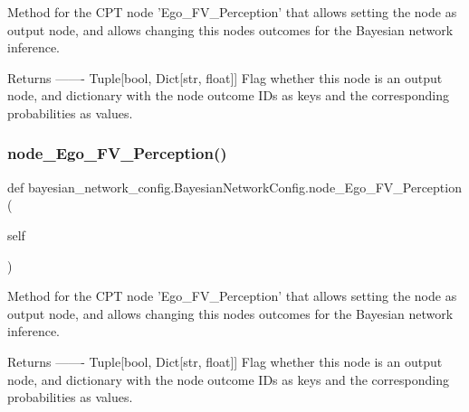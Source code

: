 \begin{DoxyVerb}Method for the CPT node 'Ego_FV_Perception' that allows setting the node as output node,
and allows changing this nodes outcomes for the Bayesian network inference.

Returns
-------
Tuple[bool, Dict[str, float]]
    Flag whether this node is an output node, and dictionary with the node outcome IDs as keys
    and the corresponding probabilities as values.
\end{DoxyVerb}
 \mbox{\label{classbayesian__network__config_1_1_bayesian_network_config_aff3733f4b57dcb4c4cbc0184ea07c133}} 
\subsubsection{\texorpdfstring{node\+\_\+\+Ego\+\_\+\+F\+V\+\_\+\+Perception()}{node\_Ego\_FV\_Perception()}\hspace{0.1cm}{\footnotesize\ttfamily [2/3]}}
{\footnotesize\ttfamily def bayesian\+\_\+network\+\_\+config.\+Bayesian\+Network\+Config.\+node\+\_\+\+Ego\+\_\+\+F\+V\+\_\+\+Perception (\begin{DoxyParamCaption}\item[{}]{self }\end{DoxyParamCaption})}

\begin{DoxyVerb}Method for the CPT node 'Ego_FV_Perception' that allows setting the node as output node, 
and allows changing this nodes outcomes for the Bayesian network inference.

Returns
-------
Tuple[bool, Dict[str, float]]
    Flag whether this node is an output node, and dictionary with the node outcome IDs as keys 
    and the corresponding probabilities as values.
\end{DoxyVerb}
 \mbox{\label{classbayesian__network__config_1_1_bayesian_network_config_aff3733f4b57dcb4c4cbc0184ea07c133}} 
